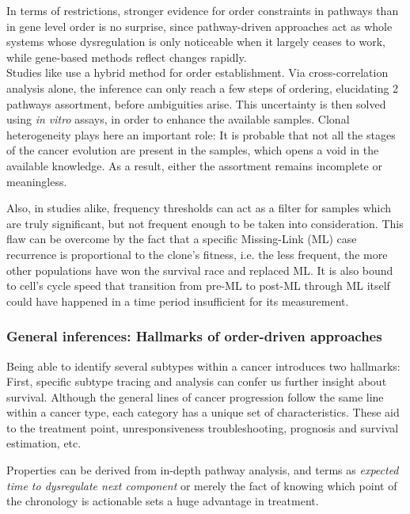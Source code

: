 In terms of restrictions, stronger evidence for order constraints in pathways than in gene level order is no surprise, since pathway-driven approaches act as whole systems whose dysregulation is only noticeable when it largely ceases to work, while gene-based methods reflect changes rapidly.
\\

Studies like \cite{Cheng2012AGliomagenesis} use a hybrid method for order establishment. Via cross-correlation analysis alone, the inference can only reach a few steps of ordering, elucidating 2 pathways assortment, before ambiguities arise. This uncertainty is then solved using \emph{in vitro} assays, in order to enhance the available samples. Clonal heterogeneity plays here an important role: It is probable that not all the stages of the cancer evolution are present in the samples, which opens a void in the available knowledge. As a result, either the assortment remains incomplete or meaningless.

Also, in studies alike, frequency thresholds can act as a filter for samples which are truly significant, but not frequent enough to be taken into consideration. This flaw can be overcome by the fact that a specific Missing-Link (ML) case recurrence is proportional to the clone's fitness, i.e. the less frequent, the more other populations have won the survival race and replaced ML. It is also bound to cell's cycle speed that transition from pre-ML to post-ML through ML itself could have happened in a time period insufficient for its measurement.
\\

\subsubsection{General inferences: Hallmarks of order-driven approaches}
Being able to identify several subtypes within a cancer introduces two hallmarks: First, specific subtype tracing and analysis can confer us further insight about survival. Although the general lines of cancer progression follow the same line within a cancer type, each category has a unique set of characteristics. These aid to the treatment point, unresponsiveness troubleshooting, prognosis and survival estimation, etc.

Properties can be derived from in-depth pathway analysis, and terms as \emph{expected time to dysregulate next component} or merely the fact of knowing which point of the chronology is actionable sets a huge advantage in treatment.
\\

